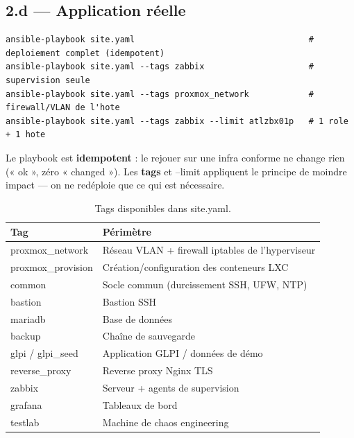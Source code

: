 \documentclass[11pt,a4paper]{article}
\newcommand{\cmd}[1]{{\ttfamily #1}}
\begin{document}
\subsection{2.d — Application réelle}
\begin{lstlisting}[style=bash]
ansible-playbook site.yaml                                   # deploiement complet (idempotent)
ansible-playbook site.yaml --tags zabbix                     # supervision seule
ansible-playbook site.yaml --tags proxmox_network            # firewall/VLAN de l'hote
ansible-playbook site.yaml --tags zabbix --limit atlzbx01p   # 1 role + 1 hote
\end{lstlisting}
\begin{pourquoi}
Le playbook est \textbf{idempotent} : le rejouer sur une infra conforme ne change rien
(« ok », zéro « changed »). Les \textbf{tags} et \cmd{--limit} appliquent le principe de
moindre impact — on ne redéploie que ce qui est nécessaire.
\end{pourquoi}

\begin{table}[h]
\centering\small
\begin{tabularx}{\linewidth}{@{}l X@{}}
\toprule
\textbf{Tag} & \textbf{Périmètre} \\
\midrule
\cmd{proxmox_network}   & Réseau VLAN + firewall iptables de l'hyperviseur \\
\cmd{proxmox_provision} & Création/configuration des conteneurs LXC \\
\cmd{common}            & Socle commun (durcissement SSH, UFW, NTP) \\
\cmd{bastion}           & Bastion SSH \\
\cmd{mariadb}           & Base de données \\
\cmd{backup}            & Chaîne de sauvegarde \\
\cmd{glpi} / \cmd{glpi_seed} & Application GLPI / données de démo \\
\cmd{reverse_proxy}     & Reverse proxy Nginx TLS \\
\cmd{zabbix}            & Serveur + agents de supervision \\
\cmd{grafana}           & Tableaux de bord \\
\cmd{testlab}           & Machine de chaos engineering \\
\bottomrule
\end{tabularx}
\caption{Tags disponibles dans \cmd{site.yaml}.}
\end{table}

\end{document}
